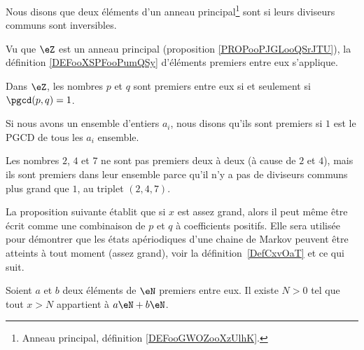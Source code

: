 \begin{definition}      \label{DEFooXSPFooPumQSy}
    Nous disons que deux éléments d'un anneau principal\footnote{Anneau principal, définition \ref{DEFooGWOZooXzUlhK}.} sont  si leurs diviseurs communs sont inversibles.
\end{definition}

Vu que \( \eZ\) est un anneau principal (proposition \ref{PROPooPJGLooQSrJTU}), la définition \ref{DEFooXSPFooPumQSy} d'éléments premiers entre eux s'applique. 

\begin{lemma}       \label{LEMooLKLTooXUdsgB}
    Dans \( \eZ\), les nombres \( p\) et \( q\) sont premiers entre eux si et seulement si \( \pgcd(p,q)=1\).
\end{lemma}


\begin{definition}  \label{DefZHRXooNeWIcB}
	Si nous avons un ensemble d'entiers \( a_i\), nous disons qu'ils sont premiers  si \( 1\) est le PGCD de tous les \( a_i\) ensemble.
\end{definition}

Les nombres \( 2\), \( 4\) et \( 7\) ne sont pas premiers deux à deux (à cause de \( 2\) et \( 4\)), mais ils sont premiers dans leur ensemble parce qu'il n'y a pas de diviseurs communs plus grand que \( 1\), au triplet \( (2, 4, 7)\).

La proposition suivante établit que si \( x\) est assez grand, alors il peut même être écrit comme une combinaison de \( p\) et \( q\) à coefficients positifs. Elle sera utilisée pour démontrer que les états apériodiques d'une chaine de Markov peuvent être atteints à tout moment (assez grand), voir la définition~\ref{DefCxvOaT} et ce qui suit.

\begin{proposition}     \label{PropLAbRSE}
	Soient \( a\) et \( b\) deux éléments de \( \eN\) premiers entre eux. Il existe \( N>0\) tel que tout \( x>N\) appartient à \( a\eN+b\eN\).
\end{proposition}

